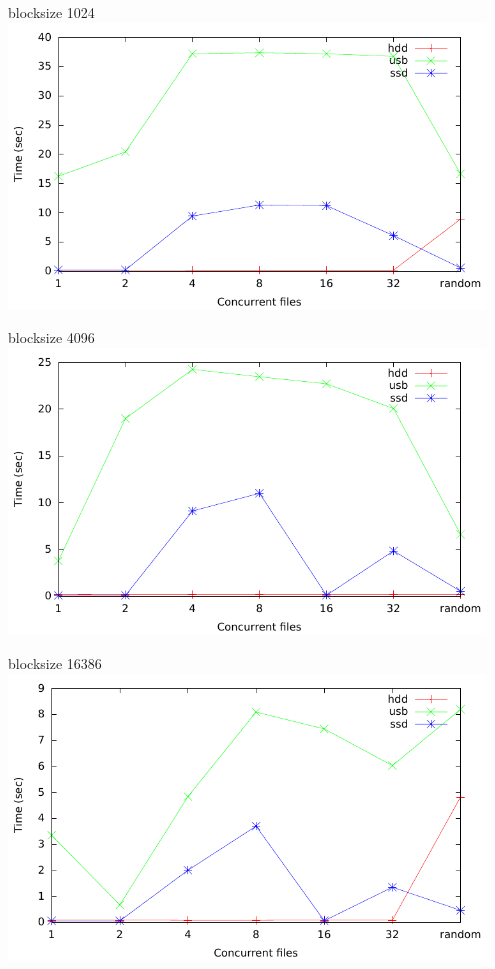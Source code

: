 \documentclass[screen]{beamer} %
\begin{document}
\begin{frame}
  \begin{center}
    blocksize 1024
    \includegraphics[width=0.95\textwidth]{../report/res/1024} 
  \end{center}
\end{frame}

\begin{frame}
  \begin{center}
    blocksize 4096
    \includegraphics[width=0.95\textwidth]{../report/res/4096} 
  \end{center}
\end{frame}

\begin{frame}
  \begin{center}
    blocksize 16386
    \includegraphics[width=0.95\textwidth]{../report/res/16386} 
  \end{center}
\end{frame}
\end{document}
